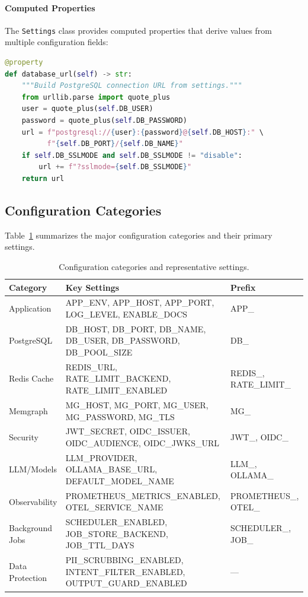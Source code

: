 \paragraph{Computed Properties}
The \texttt{Settings} class provides computed properties that derive values from multiple configuration fields:

\begin{lstlisting}[language=Python, caption=Computed database URL property]
@property
def database_url(self) -> str:
    """Build PostgreSQL connection URL from settings."""
    from urllib.parse import quote_plus
    user = quote_plus(self.DB_USER)
    password = quote_plus(self.DB_PASSWORD)
    url = f"postgresql://{user}:{password}@{self.DB_HOST}:" \
          f"{self.DB_PORT}/{self.DB_NAME}"
    if self.DB_SSLMODE and self.DB_SSLMODE != "disable":
        url += f"?sslmode={self.DB_SSLMODE}"
    return url
\end{lstlisting}

\subsection{Configuration Categories}

Table~\ref{tab:config-categories} summarizes the major configuration categories and their primary settings.

\begin{table}[ht]
\centering
\caption{Configuration categories and representative settings.}
\label{tab:config-categories}
\small
\begin{tabularx}{\textwidth}{|>{\raggedright\arraybackslash}p{2.2cm}|>{\raggedright\arraybackslash}X|>{\raggedright\arraybackslash}p{2.2cm}|}
\hline
\textbf{Category} & \textbf{Key Settings} & \textbf{Prefix} \\
\hline
Application & APP\_ENV, APP\_HOST, APP\_PORT, LOG\_LEVEL, ENABLE\_DOCS & APP\_ \\
\hline
PostgreSQL & DB\_HOST, DB\_PORT, DB\_NAME, DB\_USER, DB\_PASSWORD, DB\_POOL\_SIZE & DB\_ \\
\hline
Redis Cache & REDIS\_URL, RATE\_LIMIT\_BACKEND, RATE\_LIMIT\_ENABLED & REDIS\_, RATE\_LIMIT\_ \\
\hline
Memgraph & MG\_HOST, MG\_PORT, MG\_USER, MG\_PASSWORD, MG\_TLS & MG\_ \\
\hline
Security & JWT\_SECRET, OIDC\_ISSUER, OIDC\_AUDIENCE, OIDC\_JWKS\_URL & JWT\_, OIDC\_ \\
\hline
LLM/Models & LLM\_PROVIDER, OLLAMA\_BASE\_URL, DEFAULT\_MODEL\_NAME & LLM\_, OLLAMA\_ \\
\hline
Observability & PROMETHEUS\_METRICS\_ENABLED, OTEL\_SERVICE\_NAME & PROMETHEUS\_, OTEL\_ \\
\hline
Background Jobs & SCHEDULER\_ENABLED, JOB\_STORE\_BACKEND, JOB\_TTL\_DAYS & SCHEDULER\_, JOB\_ \\
\hline
Data Protection & PII\_SCRUBBING\_ENABLED, INTENT\_FILTER\_ENABLED, OUTPUT\_GUARD\_ENABLED & --- \\
\hline
\end{tabularx}
\end{table}

